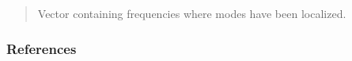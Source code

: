 \documentclass[letterpaper,10pt,english]{sphinxmanual}
\begin{document}
\begin{fulllineitems}
\begin{quote}
\begin{description}
\begin{description}
\end{description}

\begin{description}
\sphinxlineitem{\sphinxstylestrong{f\_modes}}{[}\sphinxtitleref{np.ndarray}{]}
\sphinxAtStartPar
Vector containing frequencies where modes have been localized.

\end{description}

\end{description}\end{quote}
\subsubsection*{References}

\sphinxAtStartPar
{}

\end{fulllineitems}

\end{document}

